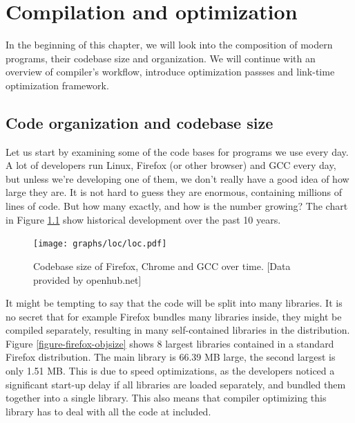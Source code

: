 \newcommand{\definice}{\paragraph{Definice.}}

\chapter{Compilation and optimization}

In the beginning of this chapter, we will look into the composition of modern
programs, their codebase size and organization. We will continue with an
overview of compiler's workflow, introduce optimization passses and link-time
optimization framework.

\section{Code organization and codebase size}

Let us start by examining some of the code bases for programs we use every day.
A lot of developers run Linux, Firefox (or other browser) and GCC every day, but
unless we're developing one of them, we don't really have a good idea of how large
they are. It is not hard to guess they are enormous, containing millions of
lines of code. But how many exactly, and how is the number growing?
The chart in Figure \ref{figure-loc} show historical development over the past
10 years.

\begin{figure}[h!]
\label{figure-loc}
\centering
	\hspace{-1cm}\texttt{[image: graphs/loc/loc.pdf]}
\caption{Codebase size of Firefox, Chrome and GCC over time. [Data provided by
	openhub.net]}
\end{figure}

It might be tempting to say that the code will be split into many libraries. It
is no secret that for example Firefox bundles many libraries inside, they might
be compiled separately, resulting in many self-contained libraries in the
distribution. Figure \ref{figure-firefox-objsize} shows 8 largest libraries
contained in a standard Firefox distribution. The main library is 66.39 MB
large, the second largest is only 1.51 MB. This is due to speed optimizations,
as the developers noticed a significant start-up delay if all libraries are
loaded separately, and bundled them together into a single library. This also
means that compiler optimizing this library has to deal with all the code at
included.

